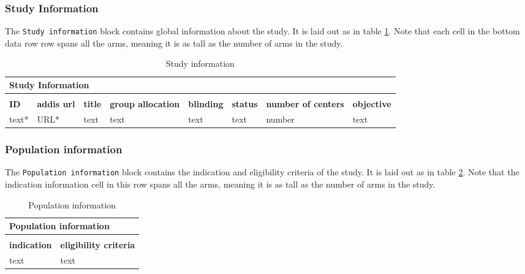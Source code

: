 \documentclass[a4paper,10pt]{article}
\begin{document}
\subsubsection{Study Information}
The \texttt{Study information} block contains global information about the study. It is laid out as in table \ref{table:Study Information}. Note that each cell in the bottom data row row spans all the arms, meaning it is as tall as the number of arms in the study.
\begin{table}[h]
  \small
  \centering
  \caption{Study information}
  \label{table:Study Information}
  \begin{tabular}{|l|l|l|l|l|l|l|l|}
    \hline
    \multicolumn{8}{|l|}{Study Information} \\ \hline
    \multicolumn{8}{|l|}{}                  \\ \hline
    \textbf{ID} & \textbf{addis url} & \textbf{title} & \textbf{group allocation} & \textbf{blinding} & \textbf{status} & \textbf{number of centers} & \textbf{objective} \\ \hline
    text* & URL* & text & text & text & text & number & text \\ \hline
  \end{tabular}
\end{table}

\subsubsection{Population information}
The \texttt{Population information} block contains the indication and eligibility criteria of the study. It is laid out as in table \ref{table:Population information}. Note that the indication information cell in this row spans all the arms, meaning it is as tall as the number of arms in the study.
\begin{table}[h]
  \centering
  \caption{Population information}
  \label{table:Population information}
  \begin{tabular}{|l|l|}
    \hline
    \multicolumn{2}{|l|}{\textbf{Population information}} \\ \hline
    \multicolumn{2}{|l|}{}                                \\ \hline
    \textbf{indication} & \textbf{eligibility criteria}   \\ \hline
    text & text                                           \\ \hline
  \end{tabular}
\end{table}
\end{document}
